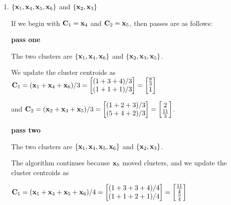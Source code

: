 \begin{solution}
\begin{enumerate}
  \item
  
  \begin{answer}
  $\{\mathbf{x}_1, \mathbf{x}_4, \mathbf{x}_5, \mathbf{x}_6\}$ and $\{\mathbf{x}_2, \mathbf{x}_3 \}$
  \end{answer}
  
  If we begin with $\mathbf{C}_1 = \mathbf{x}_4$ and $\mathbf{C}_2 = \mathbf{x}_5$, then passes are as follows:
  
  \textbf{pass one}
  
 The two clusters are $ \{\mathbf{x}_1, \mathbf{x}_4, \mathbf{x}_6\}$ and  $\{\mathbf{x}_2, \mathbf{x}_3, \mathbf{x}_5\}$.
  
  We update the cluster centroids as $\mathbf{C}_1 = (\mathbf{x}_1 + \mathbf{x}_4 + \mathbf{x}_6)/3
  = \begin{bmatrix}(1 + 3 + 4) / 3 \\ (1 + 1 + 1)/3\end{bmatrix} = \begin{bmatrix}\frac{8}{3} \\ 1\end{bmatrix}$
  
  and $\mathbf{C}_2 = (\mathbf{x}_2 + \mathbf{x}_3 +  \mathbf{x}_5) / 3 = \begin{bmatrix}(1 + 2 + 3)/3\\(5 + 4 + 2)/3\end{bmatrix} = \begin{bmatrix}2\\\frac{11}{3}\end{bmatrix}$.
  
    \textbf{pass two}
    
    The two clusters are $\{\mathbf{x}_1, \mathbf{x}_4, \mathbf{x}_5, \mathbf{x}_6\}$ and $\{\mathbf{x}_2, \mathbf{x}_3\}$.
 
  The algorithm continues because $\mathbf{x}_5$ moved clusters, and we update the cluster centroids as
  
  $\mathbf{C}_1 = (\mathbf{x}_1 + \mathbf{x}_4 + \mathbf{x}_5 + \mathbf{x}_6)/4
  = \begin{bmatrix}(1 + 3 + 3 + 4) / 4 \\ (1 + 1 + 2 + 1)/4\end{bmatrix} = \begin{bmatrix}\frac{11}{4} \\ \frac{5}{4}\end{bmatrix}$
  

\end{enumerate}
\end{solution}
